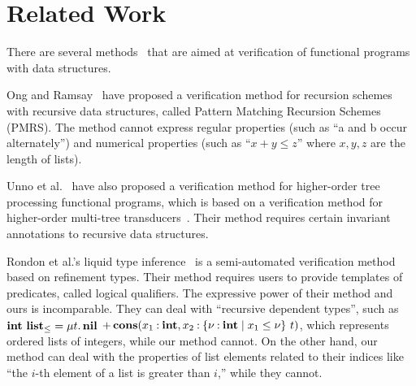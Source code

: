 \vspace{-5pt}
\section{Related Work}
\label{sec:related}

There are several
methods~\cite{Ong2011,Kobayashi2010,Unno2010,Rondon2008,Kawaguchi2009,Jhala2011,Xi1999,Unno2009,Xu2012,Chin2003}
that are aimed at verification of functional programs with data
structures.

Ong and Ramsay~\cite{Ong2011} have proposed a verification method for
recursion schemes with recursive data structures, called Pattern Matching
Recursion Schemes (PMRS).  The method cannot express regular properties
(such as ``a and b occur alternately'') and numerical properties (such
as ``$x+y \leq z$'' where $x,y,z$ are the length of lists).

Unno et al.~\cite{Unno2010} have also proposed a verification method for
higher-order tree processing functional programs, which is based on a
verification method for higher-order multi-tree
transducers~\cite{Kobayashi2010}. Their method requires certain
invariant annotations to recursive data structures.

Rondon et al.'s liquid type inference~\cite{Rondon2008,Kawaguchi2009} is a
semi-automated verification method based on refinement types.  Their method requires
users to provide templates of predicates, called logical qualifiers.  The
expressive power of their method and ours is incomparable.  They can
deal with ``recursive dependent types'', such as ${\mathbf{int}}~{\mathbf{list}_\leq}
= \mu t.\, \mathbf{nil}$ $\mathop{+}
\mathbf{cons}({x_1\mathbin{:}\mathbf{int}},{x_2\mathbin{:}{\{\nu\mathbin{:}\mathbf{int} \mid x_1 \leq \nu\}}~{t}})$,
which represents ordered lists of integers, while our method cannot. On
the other hand, our method can deal with the properties of list elements
related to their indices like ``the $i$-th element of a list is greater
than $i$,'' while they cannot.

